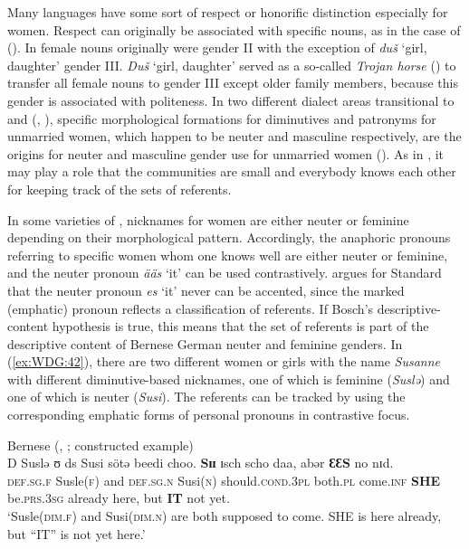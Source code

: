 \documentclass[output=collectionpaper]{langsci/langscibook}
\begin{document}
Many languages have some sort of respect or honorific distinction especially for women. Respect can originally be associated with specific nouns, as in the case of  (). In  female nouns originally were gender II with the exception of \textit{duš} `girl, daughter' gender III. \textit{Duš} `girl, daughter' served as a so-called \emph{Trojan horse} (\citealt[100]{Corbett1991}) to transfer all female nouns to gender III except older family members, because this gender is associated with politeness. In two different  dialect areas transitional to  and  (, ), specific morphological formations for diminutives and patronyms for unmarried women, which happen to be neuter and masculine respectively, are the origins for neuter and masculine gender use for unmarried women (\citealt[101]{Corbett1991}). As in , it may play a role that the communities are small and everybody knows each other for keeping track of the sets of referents.

In some varieties of , nicknames for women are either neuter or feminine depending on their morphological pattern. Accordingly, the anaphoric pronouns referring to specific women whom one knows well are either neuter or feminine, and the neuter pronoun \textit{ääs} `it' can be used contrastively. \cite[218]{Bosch1988} argues for Standard  that the neuter pronoun \textit{es} `it' never can be accented, since the marked (emphatic) pronoun reflects a classification of referents. If Bosch's descriptive-content hypothesis is true, this means that the set of referents is part of the descriptive content of Bernese German neuter and feminine genders. In (\ref{ex:WDG:42}), there are two different women or girls with the name \textit{Susanne} with different diminutive-based nicknames, one of which is feminine (\textit{Suslǝ}) and one of which is neuter (\textit{Susi}). The referents can be tracked by using the corresponding emphatic forms of personal pronouns in contrastive focus.

\ea\label{ex:WDG:42}
Bernese  (, ; constructed example)\\
\gll D	Suslǝ	ʊ	ds	Susi	sötǝ	beedi	choo. \textbf{Sɪɪ}	ɪsch	scho	daa,	abǝr	\textbf{ƐƐS}	no	nɪd.\\
\textsc{def.sg.f}	Susle(\textsc{f})	and	\textsc{def.sg.n}	Susi(\textsc{n})	should.\textsc{cond.3pl}	both.\textsc{pl}	come.\textsc{inf} \textbf{SHE}	be.\textsc{prs.3sg}	already	here,	but	\textbf{IT}	not	yet.\\
\glt `Susle(\textsc{dim.f}) and Susi(\textsc{dim.n}) are both supposed to come. SHE is here already, but ``IT'' is not yet here.'\\
\z
\end{document}
